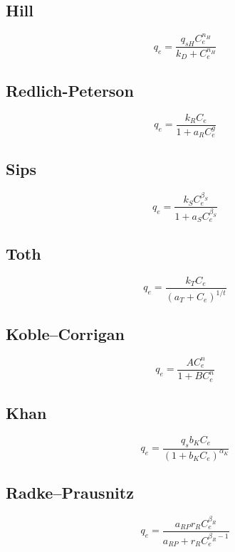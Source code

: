 \documentclass[3p]{elsarticle}
\begin{document}
\subsection{Hill}
\begin{equation}
q_e = \frac{q_{sH}C_e^{n_H}}{k_D+C_e^{n_H}}
\end{equation}
\cite{Hill1910}

\subsection{Redlich-Peterson}
\begin{equation}
q_e = \frac{k_RC_e}{1 + a_RC_e^g}
\end{equation}
\cite{Redlich1959}

\subsection{Sips}
\begin{equation}
q_e = \frac{k_SC_e^{\beta_S}}{1 + a_SC_e^{\beta_S}}
\end{equation}
\cite{Sips1948}

\subsection{Toth}
\begin{equation}
q_e = \frac{k_TC_e}{\left(a_T+C_e\right)^{1/t}}
\end{equation}

\subsection{Koble–Corrigan}
\begin{equation}
q_e = \frac{AC_e^n}{1+BC_e^n}
\end{equation}

\subsection{Khan}
\begin{equation}
q_e = \frac{q_sb_KC_e}{\left(1+b_KC_e\right)^{\alpha_K}}
\end{equation}

\subsection{Radke–Prausnitz}
\begin{equation}
q_e = \frac{a_{RP}r_RC_e^{\beta_R}}{a_{RP}+r_RC_e^{\beta_R-1}}
\end{equation}
\end{document}
